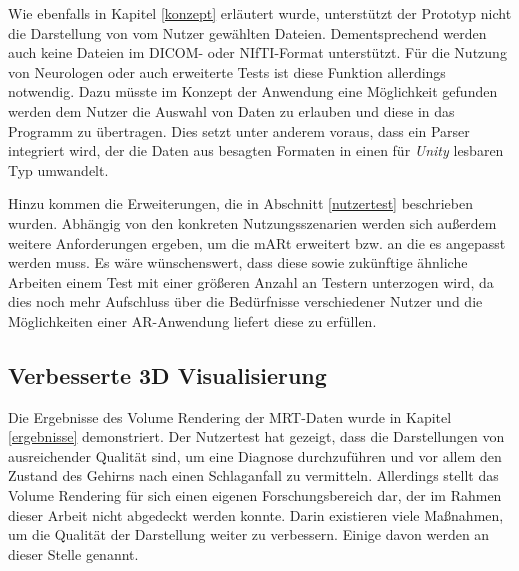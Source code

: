 Wie ebenfalls in Kapitel \ref{konzept} erläutert wurde, unterstützt der Prototyp nicht die Darstellung von vom Nutzer gewählten Dateien. Dementsprechend werden auch keine Dateien im DICOM- oder NIfTI-Format unterstützt. Für die Nutzung von Neurologen oder auch erweiterte Tests ist diese Funktion allerdings notwendig. Dazu müsste im Konzept der Anwendung eine Möglichkeit gefunden werden dem Nutzer die Auswahl von Daten zu erlauben und diese in das Programm zu übertragen. Dies setzt unter anderem voraus, dass ein Parser integriert wird, der die Daten aus besagten Formaten in einen für \textit{Unity} lesbaren Typ umwandelt. 

Hinzu kommen die Erweiterungen, die in Abschnitt \ref{nutzertest} beschrieben wurden. 
Abhängig von den konkreten Nutzungsszenarien werden sich außerdem weitere Anforderungen ergeben, um die mARt erweitert bzw. an die es angepasst werden muss. 
Es wäre wünschenswert, dass diese sowie zukünftige ähnliche Arbeiten einem Test mit einer größeren Anzahl an Testern unterzogen wird, da dies noch mehr Aufschluss über die Bedürfnisse verschiedener Nutzer und die Möglichkeiten einer AR-Anwendung liefert diese zu erfüllen.

\subsection{Verbesserte 3D Visualisierung}

Die Ergebnisse des Volume Rendering der MRT-Daten wurde in Kapitel \ref{ergebnisse} demonstriert. Der Nutzertest hat gezeigt, dass die Darstellungen von ausreichender Qualität sind, um eine Diagnose durchzuführen und vor allem den Zustand des Gehirns nach einen Schlaganfall zu vermitteln. 
Allerdings stellt das Volume Rendering für sich einen eigenen Forschungsbereich dar, der im Rahmen dieser Arbeit nicht abgedeckt werden konnte. Darin existieren viele Maßnahmen, um die Qualität der Darstellung weiter zu verbessern. Einige davon werden an dieser Stelle genannt. 

